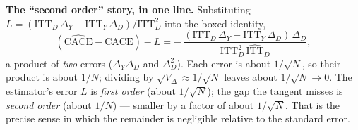 \documentclass[11pt]{article}
\newcommand{\ITTY}{\mathrm{ITT}_Y}
\newcommand{\ITTD}{\mathrm{ITT}_D}
\newcommand{\CACE}{\mathrm{CACE}}
\newcommand{\hITTD}{\widehat{\mathrm{ITT}}_D}
\newcommand{\hCACE}{\widehat{\mathrm{CACE}}}
\begin{document}
\bigskip
\noindent\textbf{The ``second order'' story, in one line.}
Substituting $L = (\ITTD\,\Delta_Y - \ITTY\,\Delta_D)/\ITTD^{2}$ into the boxed
identity,
\begin{equation*}
\left(\hCACE - \CACE\right) - L
= -\,\frac{\left(\ITTD\,\Delta_Y - \ITTY\,\Delta_D\right)\,\Delta_D}
{\ITTD^{2}\,\hITTD},
\end{equation*}
a product of \emph{two} errors ($\Delta_Y\Delta_D$ and $\Delta_D^{2}$). Each error
is about $1/\sqrt{N}$, so their product is about $1/N$; dividing by
$\sqrt{V_\Delta}\approx 1/\sqrt{N}$ leaves about $1/\sqrt{N}\to 0$. The estimator's
error $L$ is \emph{first order} (about $1/\sqrt{N}$); the gap the tangent misses is
\emph{second order} (about $1/N$) --- smaller by a factor of about $1/\sqrt{N}$.
That is the precise sense in which the remainder is negligible relative to the
standard error.
\end{document}

